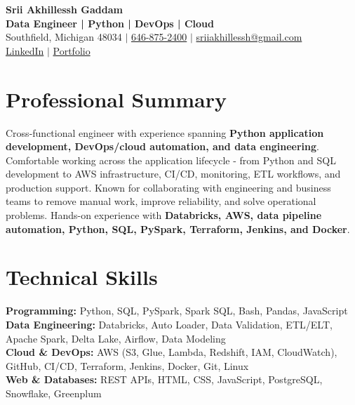 \documentclass[letterpaper,10pt]{article}
\begin{document}
\fontsize{9.35pt}{10.45pt}\selectfont

\begin{center}
    {\LARGE \textbf{Srii Akhillessh Gaddam}} \\[-1pt]
    \textbf{Data Engineer | Python | DevOps | Cloud} \\[2pt]
    Southfield, Michigan 48034 $|$
    \href{tel:6468752400}{646-875-2400} $|$
    \href{mailto:sriiakhillessh@gmail.com}{sriiakhillessh@gmail.com} \\[1pt]
    \href{https://www.linkedin.com/in/srii-akhiilessh-gaddam-b48668191/}{LinkedIn} $|$
    \href{https://sriiakhillesshg.github.io/portfolio/}{Portfolio}
\end{center}
\vspace{-8pt}

\section{Professional Summary}
\small{Cross-functional engineer with experience spanning \textbf{Python application development, DevOps/cloud automation, and data engineering}. Comfortable working across the application lifecycle - from Python and SQL development to AWS infrastructure, CI/CD, monitoring, ETL workflows, and production support. Known for collaborating with engineering and business teams to remove manual work, improve reliability, and solve operational problems. Hands-on experience with \textbf{Databricks, AWS, data pipeline automation, Python, SQL, PySpark, Terraform, Jenkins, and Docker}.}

\section{Technical Skills}
\small{
\textbf{Programming:} Python, SQL, PySpark, Spark SQL, Bash, Pandas, JavaScript \\
\textbf{Data Engineering:} Databricks, Auto Loader, Data Validation, ETL/ELT, Apache Spark, Delta Lake, Airflow, Data Modeling \\
\textbf{Cloud \& DevOps:} AWS (S3, Glue, Lambda, Redshift, IAM, CloudWatch), GitHub, CI/CD, Terraform, Jenkins, Docker, Git, Linux \\
\textbf{Web \& Databases:} REST APIs, HTML, CSS, JavaScript, PostgreSQL, Snowflake, Greenplum
}

\end{document}
